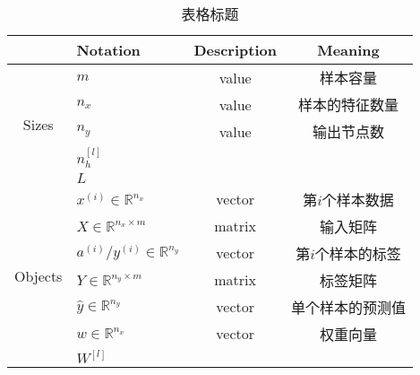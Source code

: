 \begin{table}[h]
	\centering
	\begin{threeparttable}
	\caption{表格标题}
	\begin{tabular}{clcc}
		\hline
									& \textbf{Notation}                         & \textbf{Description} & \textbf{Meaning}                                                   \\ \hline
		\multirow{5}{*}{Sizes}   & $m$                                       & value                & 样本容量                                                               \\
									& $n_x$                                     & value                & 样本的特征数量                                                            \\
									& $n_y$                                     & value                & 输出节点数                                                              \\
									& $n_h^{[l]}$                               &                      &                                                                    \\
									& $L$                                       &                      &                                                                    \\ \hline
		\multirow{7}{*}{Objects} & $x^{(i)} \in \mathbb{R}^{n_x}$            & vector               & 第$i$个样本数据                                                          \\
									& $X \in {\mathbb{R}^{n_x \times m}}$       & matrix               & 输入矩阵                                                               \\
									& $a^{(i)} / y^{(i)} \in \mathbb{R}^{n_y}$  & vector               & 第$i$个样本的标签                                                         \\
									& $Y \in {\mathbb{R}^{n_y \times m}}$       & matrix               & 标签矩阵                                                               \\
									& $\hat{y} \in \mathbb{R}^{n_y}$            & vector               & 单个样本的预测值                                                           \\
									& $w \in \mathbb{R}^{n_x}$                  & vector               & 权重向量                                                               \\
									& $W^{[l]}$                                 &                      &                                                                    \\

\end{tabular}
\end{threeparttable}
\end{table}
